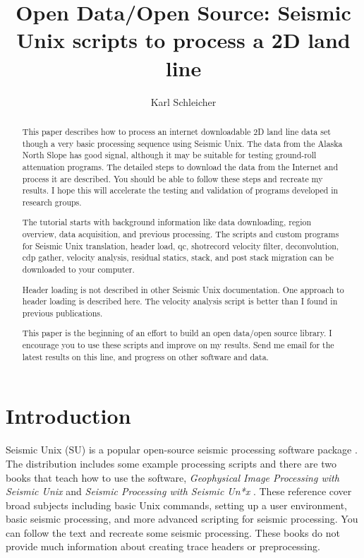 
\title{Open Data/Open Source: Seismic Unix scripts to process a 2D land line}               %
\author{Karl Schleicher}

\maketitle

\begin{abstract}
This paper describes how to process an internet downloadable 2D land 
line data set though a very basic processing sequence using Seismic 
Unix. The data from the Alaska North Slope has good signal, 
although it may be suitable for testing ground-roll attenuation 
programs.  The detailed steps to download the data from the 
Internet and process it are described.  You should be able to 
follow these steps and recreate my results.  I hope this will 
accelerate the testing and validation of programs developed in 
research groups.
\par
The tutorial starts with background information like data downloading,
region overview, data acquisition, and previous processing.  The
scripts and custom programs for Seismic Unix translation, header load, 
qc, shotrecord velocity filter, deconvolution, cdp gather, velocity 
analysis, residual statics, stack, and post stack migration can be 
downloaded to your computer.

Header loading is not described in other Seismic Unix documentation.
One approach to header loading is described here.  The velocity
analysis script is better than I found in previous publications.

This paper is the beginning of an effort to build an open data/open source 
library.  I encourage you to use these scripts and improve on my results.  
Send me email for the latest results on this line, and progress on other 
software and data.
\end{abstract}

\section{Introduction}
Seismic Unix (SU) is a popular open-source seismic processing 
software package \cite[]{TLE16-07-10451049} \cite[]{cohen}.  The 
distribution includes some example processing
scripts and there are two books that teach how to use the software,
\emph{Geophysical Image Processing with Seismic Unix} \cite[]{stockwell} 
and \emph{Seismic Processing with Seismic Un*x} \cite[]{forel}.  These 
reference cover broad subjects including basic Unix commands, setting 
up a user environment, basic seismic processing, and more advanced 
scripting for seismic processing.  You can follow the text and recreate 
some seismic processing.  These books do not provide much information 
about creating trace headers or preprocessing.\nocite{cohen}


